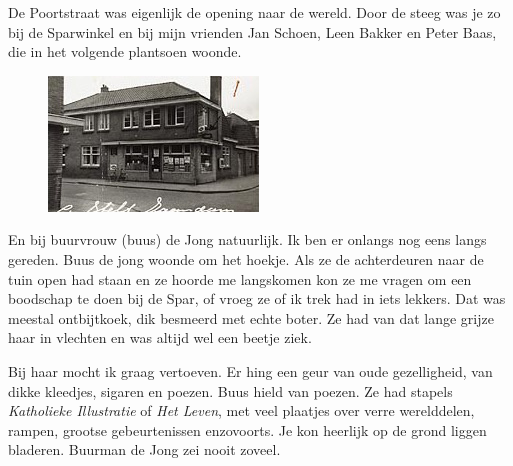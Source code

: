 \documentclass[10pt,twoside, openright]{memoir}
\begin{document}
De Poortstraat was eigenlijk de opening naar de wereld. Door de steeg was je zo bij de Sparwinkel en bij mijn vrienden Jan Schoen, Leen Bakker en Peter Baas, die in het volgende plantsoen woonde. 

\begin{figure}
\includegraphics[width=\textwidth]{img/ch5/Spar-Poortstr}
\caption*{\footnotesize }
\end{figure}

En bij buurvrouw (buus) de Jong natuurlijk. Ik ben er onlangs nog eens langs gereden. Buus de jong woonde om het hoekje. Als ze de achterdeuren naar de tuin open had staan en ze hoorde me langskomen kon ze me vragen om een boodschap te doen bij de Spar, of vroeg ze of ik trek had in iets lekkers. Dat was meestal ontbijtkoek, dik besmeerd met echte boter. Ze had van dat lange grijze haar in vlechten en was altijd wel een beetje ziek.

Bij haar mocht ik graag vertoeven. Er hing een geur van oude gezelligheid, van dikke kleedjes, sigaren en poezen. Buus hield van poezen. Ze had stapels \emph{Katholieke Illustratie} of \emph{Het Leven}, met veel plaatjes over verre werelddelen, rampen, grootse gebeurtenissen enzovoorts. Je kon heerlijk op de grond liggen bladeren. Buurman de Jong zei nooit zoveel. 
\end{document}

